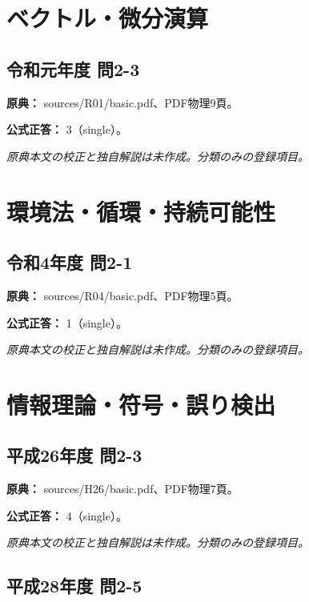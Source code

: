 \section{ベクトル・微分演算}

\subsection{令和元年度 問2-3}
\label{q:r01-reg-basic-2-3}

\noindent\textbf{原典：} sources/R01/basic.pdf、PDF物理9頁。

\textbf{公式正答：} 3（single）。

\par\textit{原典本文の校正と独自解説は未作成。分類のみの登録項目。}

\section{環境法・循環・持続可能性}

\subsection{令和4年度 問2-1}
\label{q:r04-reg-basic-2-1}

\noindent\textbf{原典：} sources/R04/basic.pdf、PDF物理5頁。

\textbf{公式正答：} 1（single）。

\par\textit{原典本文の校正と独自解説は未作成。分類のみの登録項目。}

\section{情報理論・符号・誤り検出}

\subsection{平成26年度 問2-3}
\label{q:h26-reg-basic-2-3}

\noindent\textbf{原典：} sources/H26/basic.pdf、PDF物理7頁。

\textbf{公式正答：} 4（single）。

\par\textit{原典本文の校正と独自解説は未作成。分類のみの登録項目。}

\subsection{平成28年度 問2-5}
\label{q:h28-reg-basic-2-5}


